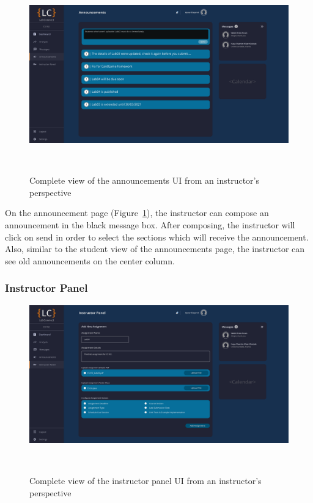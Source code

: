 \documentclass[a4paper, 12pt]{article}
\begin{document}
    \begin{figure}[H]
        \centering
        \includegraphics[width=\textwidth]{instructor_announcements}
        \caption{Complete view of the announcements UI from an instructor's perspective}~\label{fig:instructor_announcements_full}
    \end{figure}
        
    On the announcement page (Figure~\ref{fig:instructor_announcements_full}), the instructor can compose an announcement in the black message box. After composing, the instructor will click on send
    in order to select the sections which will receive the announcement. Also, similar to the student view of the announcements page, the instructor can see old announcements on the center column.
    
    
    
    \pagebreak
    
    \subsubsection{Instructor Panel}
    
    \begin{figure}[H]
        \centering
        \includegraphics[width=\textwidth]{instructor_admin_panel}
        \caption{Complete view of the instructor panel UI from an instructor's perspective}~\label{fig:instructor_admin_panel_full}
    \end{figure}
    
\end{document}
